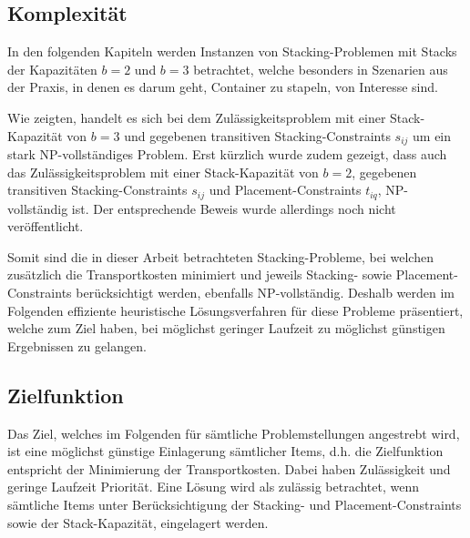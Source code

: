 \pagebreak

\subsection{Komplexität}
\label{sec:complexity}

In den folgenden Kapiteln werden Instanzen von Stacking-Problemen mit Stacks der Kapazitäten $b = 2$
und $b = 3 $ betrachtet, welche besonders in Szenarien aus der Praxis, in denen es darum geht,
Container zu stapeln, von Interesse sind.

Wie \citet{Bruns2015} zeigten, handelt es sich bei dem Zulässigkeitsproblem mit einer Stack-Kapazität von $b=3$ und gegebenen transitiven Stacking-Constraints $s_{ij}$ um ein stark NP-vollständiges Problem. Erst kürzlich wurde zudem gezeigt, dass auch das Zulässigkeitsproblem mit einer Stack-Kapazität von $b=2$, gegebenen transitiven
Stacking-Constraints $s_{ij}$ und Placement-Constraints $t_{iq}$, NP-vollständig ist. Der entsprechende Beweis
wurde allerdings noch nicht veröffentlicht.

Somit sind die in dieser Arbeit betrachteten Stacking-Probleme, bei welchen zusätzlich die Transportkosten minimiert
und jeweils Stacking- sowie Placement-Constraints berücksichtigt werden, ebenfalls NP-vollständig.
Deshalb werden im Folgenden effiziente heuristische Lösungsverfahren für diese Probleme präsentiert,
welche zum Ziel haben, bei möglichst geringer Laufzeit zu möglichst günstigen Ergebnissen zu gelangen.

\subsection{Zielfunktion}
\label{sec:objective}

Das Ziel, welches im Folgenden für sämtliche Problemstellungen angestrebt wird, ist eine möglichst günstige
Einlagerung sämtlicher Items, d.h. die Zielfunktion entspricht der Minimierung der Transportkosten.
Dabei haben Zulässigkeit und geringe Laufzeit Priorität. Eine Lösung wird als zulässig betrachtet,
wenn sämtliche Items unter Berücksichtigung der Stacking- und Placement-Constraints sowie der Stack-Kapazität, eingelagert werden.

